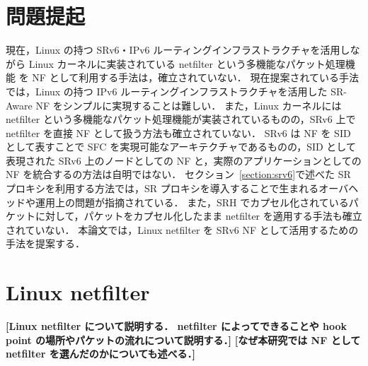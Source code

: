 \section{問題提起}
\label{section:prob}
現在，Linux の持つ SRv6・IPv6 ルーティングインフラストラクチャを活用しながら Linux カーネルに実装されている netfilter という多機能なパケット処理機能 を NF として利用する手法は，確立されていない．
現在提案されている手法では，Linux の持つ IPv6 ルーティングインフラストラクチャを活用した SR-Aware NF をシンプルに実現することは難しい．
また，Linux カーネルには netfilter という多機能なパケット処理機能が実装されているものの，SRv6 上で netfilter を直接 NF として扱う方法も確立されていない．
SRv6 は NF を SID として表すことで SFC を実現可能なアーキテクチャであるものの，SID として表現された SRv6 上のノードとしての NF と，実際のアプリケーションとしての NF を統合するの方法は自明ではない．
セクション~\ref*{section:srv6}で述べた SR プロキシを利用する方法では，SR プロキシを導入することで生まれるオーバヘッドや運用上の問題が指摘されている．
また，SRH でカプセル化されているパケットに対して，パケットをカプセル化したまま netfilter を適用する手法も確立されていない．
本論文では，Linux netfilter を SRv6 NF として活用するための手法を提案する．

\section{Linux netfilter}
\textbf{[Linux netfilter について説明する． netfilter によってできることや hook point の場所やパケットの流れについて説明する．]}
\textbf{[なぜ本研究では NF として netfilter を選んだのかについても述べる．]}
